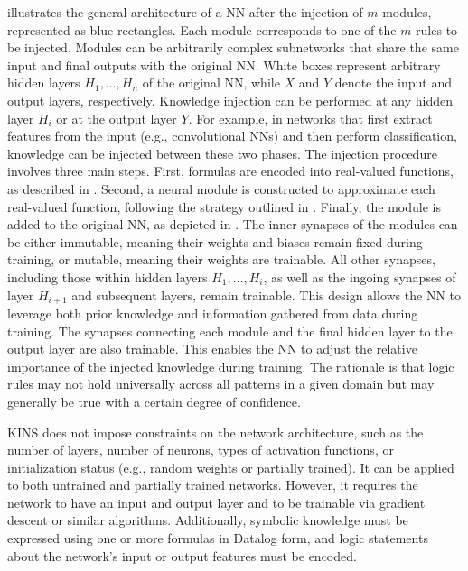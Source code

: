  illustrates the general architecture of a \gls{NN} after the injection of \(m\) modules, represented as blue rectangles.
%
Each module corresponds to one of the \(m\) rules to be injected.
%
Modules can be arbitrarily complex subnetworks that share the same input and final outputs with the original \gls{NN}.
%
White boxes represent arbitrary hidden layers \(H_1, \dots, H_n\) of the original \gls{NN}, while \(X\) and \(Y\) denote the input and output layers, respectively.
%
Knowledge injection can be performed at any hidden layer \(H_i\) or at the output layer \(Y\).
%
For example, in networks that first extract features from the input (e.g., convolutional \glspl{NN}) and then perform classification, knowledge can be injected between these two phases.
%
The injection procedure involves three main steps.
%
First, formulas are encoded into real-valued functions, as described in .
%
Second, a neural module is constructed to approximate each real-valued function, following the strategy outlined in .
%
Finally, the module is added to the original \gls{NN}, as depicted in .
%
The inner synapses of the modules can be either immutable, meaning their weights and biases remain fixed during training, or mutable, meaning their weights are trainable.
%
All other synapses, including those within hidden layers \(H_1, \dots, H_i\), as well as the ingoing synapses of layer \(H_{i+1}\) and subsequent layers, remain trainable.
%
This design allows the \gls{NN} to leverage both prior knowledge and information gathered from data during training.
%
The synapses connecting each module and the final hidden layer to the output layer are also trainable.
%
This enables the \gls{NN} to adjust the relative importance of the injected knowledge during training.
%
The rationale is that logic rules may not hold universally across all patterns in a given domain but may generally be true with a certain degree of confidence.

\gls{KINS} does not impose constraints on the network architecture, such as the number of layers, number of neurons, types of activation functions, or initialization status (e.g., random weights or partially trained).
%
It can be applied to both untrained and partially trained networks.
%
However, it requires the network to have an input and output layer and to be trainable via gradient descent or similar algorithms.
%
Additionally, symbolic knowledge must be expressed using one or more formulas in Datalog form, and logic statements about the network's input or output features must be encoded.



